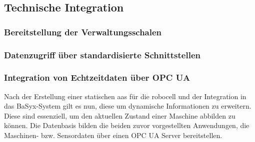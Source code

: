 \subsection{Technische Integration}
\subsubsection{Bereitstellung der Verwaltungsschalen}
\subsubsection{Datenzugriff über standardisierte Schnittstellen}



\newpage
\subsubsection{Integration von Echtzeitdaten über OPC UA}
Nach der Erstellung einer statischen \acs{aas} für die robocell und der Integration in das BaSyx-System gilt es nun, diese um dynamische Informationen zu erweitern.
Diese sind essenziell, um den aktuellen Zustand einer Maschine abbilden zu können.
Die Datenbasis bilden die beiden zuvor vorgestellten Anwendungen, die Maschinen- bzw. Sensordaten über einen OPC UA Server bereitstellen.




